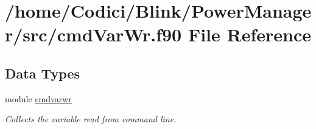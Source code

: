 \hypertarget{cmd_var_wr_8f90}{\section{/home/\-Codici/\-Blink/\-Power\-Manager/src/cmd\-Var\-Wr.f90 File Reference}
\label{cmd_var_wr_8f90}
}
\subsection*{Data Types}
\begin{DoxyCompactItemize}
\item 
module \hyperlink{classcmdvarwr}{cmdvarwr}
\begin{DoxyCompactList}\small\item\em Collects the variable read from command line. \end{DoxyCompactList}\end{DoxyCompactItemize}
